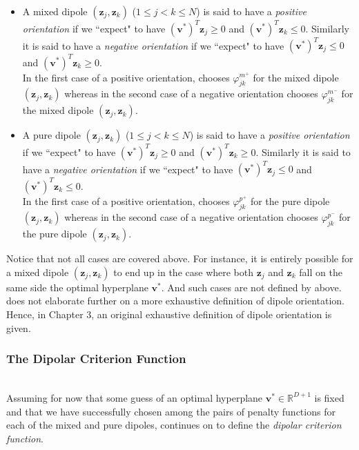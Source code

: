 \documentclass[12pt]{amsart}
\theoremstyle{definition}
\theoremstyle{plain}
\theoremstyle{remark}
\newcommand{\RR}{\mathbb{R}}
\begin{document}
\begin{itemize}
	\item A mixed dipole $(\mathbf{z}_j, \mathbf{z}_k)$ ($1 \leq j < k \leq N$) is said to have a \emph{positive orientation} if we ``expect" \cite{kretowska} to have $(\mathbf{v}^\ast)^T \mathbf{z}_j \geq 0$ and $(\mathbf{v}^\ast)^T \mathbf{z}_k \leq 0$. Similarly it is said to have a \emph{negative orientation} if we ``expect" \cite{kretowska} to have $(\mathbf{v}^\ast)^T \mathbf{z}_j \leq 0$ and $(\mathbf{v}^\ast)^T \mathbf{z}_k \geq 0$. \\
	
	In the first case of a positive orientation, \cite{kretowska} chooses $\varphi^{m^+}_{jk}$ for the mixed dipole $(\mathbf{z}_j, \mathbf{z}_k)$ whereas in the second case of a negative orientation  \cite{kretowska} chooses $\varphi^{m^-}_{jk}$ for the mixed dipole $(\mathbf{z}_j, \mathbf{z}_k)$. \\
	
	\item A pure dipole $(\mathbf{z}_j, \mathbf{z}_k)$ ($1 \leq j < k \leq N$) is said to have a \emph{positive orientation} if we ``expect" \cite{kretowska} to have $(\mathbf{v}^\ast)^T \mathbf{z}_j \geq 0$ and $(\mathbf{v}^\ast)^T \mathbf{z}_k \geq 0$. Similarly it is said to have a \emph{negative orientation} if we ``expect" \cite{kretowska} to have $(\mathbf{v}^\ast)^T \mathbf{z}_j \leq 0$ and $(\mathbf{v}^\ast)^T \mathbf{z}_k \leq 0$. \\
	
	In the first case of a positive orientation, \cite{kretowska} chooses $\varphi^{p^+}_{jk}$ for the pure dipole $(\mathbf{z}_j, \mathbf{z}_k)$ whereas in the second case of a negative orientation  \cite{kretowska} chooses $\varphi^{p^-}_{jk}$ for the pure dipole $(\mathbf{z}_j, \mathbf{z}_k)$. \\
\end{itemize} Notice that not all cases are covered above. For instance, it is entirely possible for a mixed dipole $(\mathbf{z}_j, \mathbf{z}_k)$ to end up in the case where both $\mathbf{z}_j$ and $\mathbf{z}_k$ fall on the same side the optimal hyperplane $\mathbf{v}^\ast$. And such cases are not defined by \cite{kretowska} above. \cite{kretowska} does not elaborate further on a more exhaustive definition of dipole orientation. Hence, in Chapter 3, an original exhaustive definition of dipole orientation is given.


\subsubsection{The Dipolar Criterion Function} \hfill \\


Assuming for now that some guess of an optimal hyperplane $\mathbf{v}^\ast \in \RR^{D + 1}$ is fixed and that we have successfully chosen among the pairs of penalty functions for each of the mixed and pure dipoles, \cite{kretowska} continues on to define the \emph{dipolar criterion function}.







\end{document}
